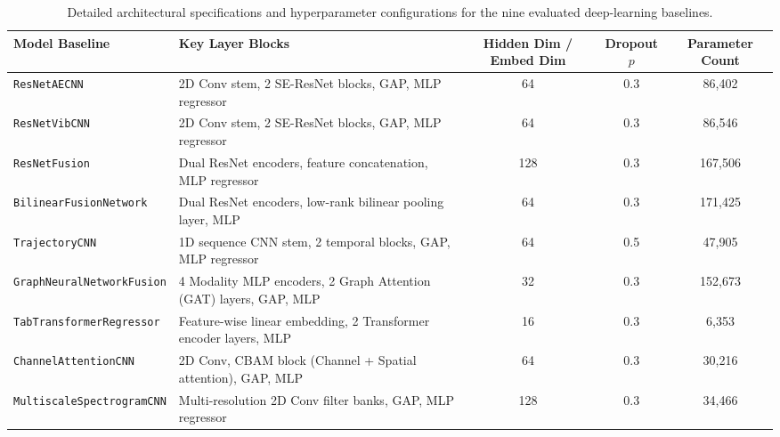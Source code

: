 \begin{table}[htbp]
\centering
\caption{Detailed architectural specifications and hyperparameter configurations for the nine evaluated deep-learning baselines.}
\label{tab:supp-dl-arch}
\begin{tabular}{lp{4cm}ccc}
\toprule
Model Baseline & Key Layer Blocks & Hidden Dim / Embed Dim & Dropout $p$ & Parameter Count \\
\midrule
\texttt{ResNetAECNN} & 2D Conv stem, 2 SE-ResNet blocks, GAP, MLP regressor & 64 & 0.3 & 86,402 \\
\texttt{ResNetVibCNN} & 2D Conv stem, 2 SE-ResNet blocks, GAP, MLP regressor & 64 & 0.3 & 86,546 \\
\texttt{ResNetFusion} & Dual ResNet encoders, feature concatenation, MLP regressor & 128 & 0.3 & 167,506 \\
\texttt{BilinearFusionNetwork} & Dual ResNet encoders, low-rank bilinear pooling layer, MLP & 64 & 0.3 & 171,425 \\
\texttt{TrajectoryCNN} & 1D sequence CNN stem, 2 temporal blocks, GAP, MLP regressor & 64 & 0.5 & 47,905 \\
\texttt{GraphNeuralNetworkFusion} & 4 Modality MLP encoders, 2 Graph Attention (GAT) layers, GAP, MLP & 32 & 0.3 & 152,673 \\
\texttt{TabTransformerRegressor} & Feature-wise linear embedding, 2 Transformer encoder layers, MLP & 16 & 0.3 & 6,353 \\
\texttt{ChannelAttentionCNN} & 2D Conv, CBAM block (Channel + Spatial attention), GAP, MLP & 64 & 0.3 & 30,216 \\
\texttt{MultiscaleSpectrogramCNN} & Multi-resolution 2D Conv filter banks, GAP, MLP regressor & 128 & 0.3 & 34,466 \\
\bottomrule
\end{tabular}
\end{table}
